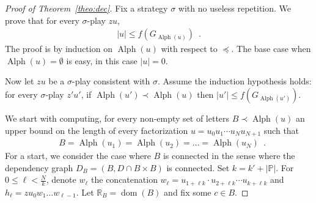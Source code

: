 \documentclass[a4paper,UKenglish]{lipics-v2016}
\newcommand{\PP}{\mathbb{P}}
\newcommand{\RR}{\mathbb{R}}
\DeclareMathOperator{\dom}{dom}
\DeclareMathOperator{\alphabet}{Alph}
\begin{document}
\begin{proof}[Proof of Theorem~\ref{theo:dec}]
Fix a strategy $\sigma$ with no useless repetition.
We prove that for every  $\sigma$-play $zu$,
\begin{align}
\label{inducdec}
|u| \leq f\left(G_{\alphabet(u)}\right)\enspace.
\end{align}
The proof is by induction on $\alphabet(u)$ with respect to $\preceq$.
The base case when $\alphabet(u)=\emptyset$
is easy, in this case
$|u|=0$.


Now let $zu$ be a $\sigma$-play consistent with $\sigma$.
Assume the induction hypothesis holds: for every $\sigma$-play $z'u'$, if
$\alphabet(u') \prec \alphabet(u)$
then
 $|u'| \leq f\left(G_{\alphabet(u')}\right)$. 
 
 We start with computing,
for every non-empty set of letters $B \prec \alphabet(u)$ 
an upper bound on the length of every factorization
$u=u_0u_1\cdots u_Nu_{N+1}$
such that
\begin{align}
&\label{eq:alphabets}
B=
\alphabet(u_1)= \alphabet(u_2)=
\ldots=
\alphabet(u_{N})
\enspace.
\end{align}
For a start, we consider the case where $B$ is connected in the sense
where the dependency graph $D_B=(B, D \cap B\times B)$ is connected.
Set $k= k' + |\PP|$.
For $0 \leq \ell < \frac{N}{k}$,
denote 
$w_\ell$ the concatenation
$w_\ell = u_{1 + \ell k } \cdot u_{2+\ell k} \cdots u_{k + \ell k}$
and 
$h_\ell=zu_0w_1\ldots w_{\ell-1}$.
Let $\RR_B=\dom(B)$ and fix some $c\in B$.


\end{proof}
\end{document}
